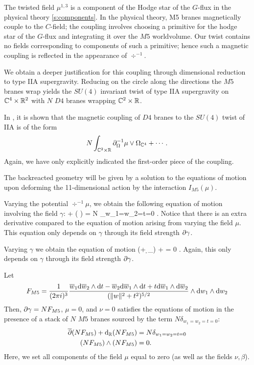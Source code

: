 The twisted field $\mu^{1,3}$ is a component of the Hodge star of the $G$-flux in the physical theory \ref{s:components}. 
In the physical theory, M5 branes magnetically couple to the $C$-field; the coupling involves choosing a primitive for the hodge star of the $G$-flux and integrating it over the $M5$ worldvolume. Our twist contains no fields corresponding to components of such a primitive; hence such a magnetic coupling is reflected in the appearance of $\div^{-1}$. 

\parsec[]

We obtain a deeper justification for this coupling through dimensional reduction to type IIA supergravity. 
Reducing on the circle along the directions the $M5$ branes wrap yields the $SU(4)$ invariant twist of type IIA supergravity on $\mathbb C^4 \times \mathbb R^2$ with $N$ $D4$ branes wrapping $\mathbb C^2 \times \mathbb R$. 

In \cite{CLsugra}, it is shown that the magnetic coupling of $D4$ branes to the $SU(4)$ twist of IIA is of the form
\[
N \int _{\mathbb{C}^2 \times \mathbb R} \partial_{\Omega}^{-1} \mu \vee \Omega_{\mathbb{C}^4} + \cdots .
\]
Again, we have only explicitly indicated the first-order piece of the coupling. 

\parsec[s:m5backreact]

The backreacted geometry will be given by a solution to the equations of motion upon deforming the 11-dimensional action by the interaction $I_{M5}(\mu)$. 

Varying the potential $\div^{-1} \mu$, we obtain the following equation of motion involving the field $\gamma$:
\beqn\label{eqn:m5eom1}
\dbar \del \gamma + \div \left( \mu\right) \wedge \del \gamma = N \delta_{w_1=w_2=t=0} .
\eeqn
Notice that there is an extra derivative compared to the equation of motion arising from varying the field $\mu$. 
This equation only depends on $\gamma$ through its field strength $\partial \gamma$. 

Varying $\gamma$ we obtain the equation of motion 
\beqn\label{eqn:m5eom2}
(\dbar + \d_\RR) \mu + \del \gamma \del \gamma = 0 .
\eeqn 
Again, this only depends on $\gamma$ through its field strength $\partial \gamma$.


\begin{lem}
\label{lem:ads7flux}
Let
\[
F_{M5} = \frac{1}{(2\pi i)^3} \frac{\overline{w}_1 {\rm d} \overline{w}_2 \wedge {\rm d} t - \overline{w}_2 {\rm d} \overline{w}_1 \wedge {\rm d} t + t {\rm d} \overline{w}_1 \wedge {\rm d} \overline{w}_2}{(\|w\|^2 + t^2)^{5/2}} \wedge {\rm d} w_1 \wedge {\rm d} w_2
\]
Then, $\partial\gamma = N F_{M5}$, $\mu = 0$, and $\nu = 0$ satisfies the equations of motion in the presence of a stack of $N$ $M5$ branes sourced by the term $N \delta_{w_1=w_2=t=0}$:
\begin{align*}
\overline{\partial} (NF_{M5}) + {\rm d}_{\mathbb R} (NF_{M5}) & = N \delta_{w_1=w_2=t=0}  \\ 
(NF_{M5}) \wedge (NF_{M5}) & = 0 .
\end{align*}
Here, we set all components of the field $\mu$ equal to zero (as well as the fields $\nu,\beta$). 
\end{lem}

